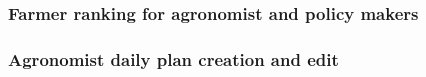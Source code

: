 \subsubsection{Farmer ranking for agronomist and policy makers}
\subsubsection{Agronomist daily plan creation and edit}






%

